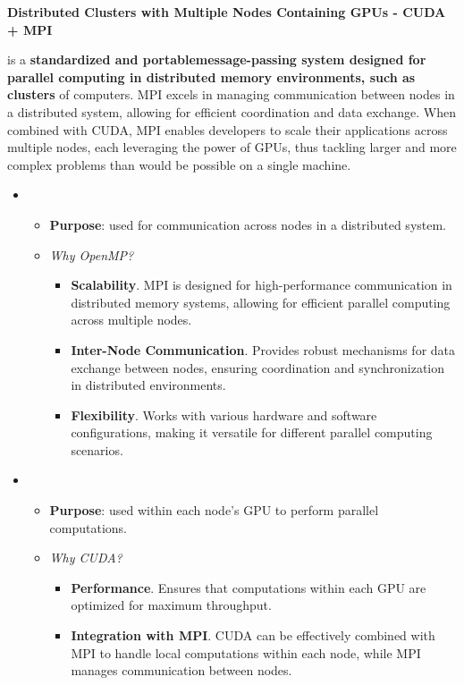 \newpage

\begin{flushleft}
  \textcolor{Green3}{ \textbf{Distributed Clusters with Multiple Nodes Containing GPUs - CUDA + MPI}}
\end{flushleft}
 is a \textbf{standardized and portable\break message-passing system designed for parallel computing in distributed memory environments, such as clusters} of computers. MPI excels in managing communication between nodes in a distributed system, allowing for efficient coordination and data exchange. When combined with CUDA, MPI enables developers to scale their applications across multiple nodes, each leveraging the power of GPUs, thus tackling larger and more complex problems than would be possible on a single machine.
\begin{itemize}
  \item {}
  \begin{itemize}
    \item \textbf{Purpose}: used for communication across nodes in a distributed system.
    \item \emph{Why OpenMP?}
    \begin{itemize}
      \item \textbf{Scalability}. MPI is designed for high-performance communication in distributed memory systems, allowing for efficient parallel computing across multiple nodes.
      \item \textbf{Inter-Node Communication}. Provides robust mechanisms for data exchange between nodes, ensuring coordination and synchronization in distributed environments.
      \item \textbf{Flexibility}. Works with various hardware and software configurations, making it versatile for different parallel computing scenarios.
    \end{itemize}
  \end{itemize}

  \item {}
  \begin{itemize}
    \item \textbf{Purpose}: used within each node's GPU to perform parallel computations.
    \item \emph{Why CUDA?}
    \begin{itemize}
      \item \textbf{Performance}. Ensures that computations within each GPU are optimized for maximum throughput.
      \item \textbf{Integration with MPI}. CUDA can be effectively combined with MPI to handle local computations within each node, while MPI manages communication between nodes.
    \end{itemize}
  \end{itemize}
\end{itemize}

